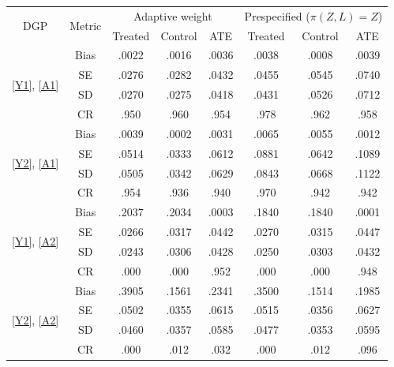 \begin{tabular}{cc| ccc |ccc}
\toprule
\multirow{2}{*}{DGP}&\multirow{2}{*}{Metric}&
\multicolumn{3}{c}{Adaptive weight}&\multicolumn{3}{|c}{Prespecified ($\pi(Z,L)=Z$)}\\
&& Treated & Control & ATE & Treated & Control & ATE\\
\midrule
\multirow{4}{*}{\ref{Y1}, \ref{A1}}
&Bias &.0022 &.0016 &.0036 &.0038 &.0008 &.0039 \\
&SE &.0276 &.0282 &.0432 &.0455 &.0545 &.0740 \\
&SD &.0270 &.0275 &.0418 &.0431 &.0526 &.0712 \\
&CR &.950 &.960 &.954 &.978 &.962 &.958 \\
[5pt]
\multirow{4}{*}{\ref{Y2}, \ref{A1}}
&Bias &.0039 &.0002 &.0031 &.0065 &.0055 &.0012 \\
&SE &.0514 &.0333 &.0612 &.0881 &.0642 &.1089 \\
&SD &.0505 &.0342 &.0629 &.0843 &.0668 &.1122 \\
&CR &.954 &.936 &.940 &.970 &.942 &.942 \\
[5pt]
\multirow{4}{*}{\ref{Y1}, \ref{A2}}
&Bias &.2037 &.2034 &.0003 &.1840 &.1840 &.0001 \\
&SE &.0266 &.0317 &.0442 &.0270 &.0315 &.0447 \\
&SD &.0243 &.0306 &.0428 &.0250 &.0303 &.0432 \\
&CR &.000 &.000 &.952 &.000 &.000 &.948 \\
[5pt]
\multirow{4}{*}{\ref{Y2}, \ref{A2}}
&Bias &.3905 &.1561 &.2341 &.3500 &.1514 &.1985 \\
&SE &.0502 &.0355 &.0615 &.0515 &.0356 &.0627 \\
&SD &.0460 &.0357 &.0585 &.0477 &.0353 &.0595 \\
&CR &.000 &.012 &.032 &.000 &.012 &.096 \\
\bottomrule
\end{tabular}
